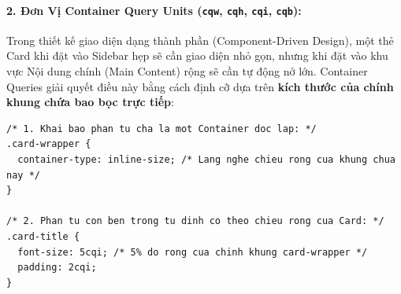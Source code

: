 \documentclass[11pt,oneside]{book}
\newcommand{\thd}[1]{\textcolor{white}{\textbf{\strut #1}}}
\newcommand{\codeinline}[1]{\textcolor{accentOrange}{\texttt{#1}}}
\newcommand{\term}[1]{\textbf{\textcolor{primaryBlue}{#1}}}
\begin{document}
\paragraph{2. Đơn Vị Container Query Units (\codeinline{cqw}, \codeinline{cqh}, \codeinline{cqi}, \codeinline{cqb}):}

Trong thiết kế giao diện dạng thành phần (Component-Driven Design), một thẻ Card khi đặt vào Sidebar hẹp sẽ cần giao diện nhỏ gọn, nhưng khi đặt vào khu vực Nội dung chính (Main Content) rộng sẽ cần tự động nở lớn. Container Queries giải quyết điều này bằng cách định cỡ dựa trên \textbf{kích thước của chính khung chứa bao bọc trực tiếp}:

\begin{prettyTableBox}
\sffamily\small
{}
\end{prettyTableBox}

\begin{codeWindow}
\begin{lstlisting}[language=CSS3]
/* 1. Khai bao phan tu cha la mot Container doc lap: */
.card-wrapper {
  container-type: inline-size; /* Lang nghe chieu rong cua khung chua nay */
}

/* 2. Phan tu con ben trong tu dinh co theo chieu rong cua Card: */
.card-title {
  font-size: 5cqi; /* 5% do rong cua chinh khung card-wrapper */
  padding: 2cqi;
}
\end{lstlisting}
\end{codeWindow}
\end{document}
